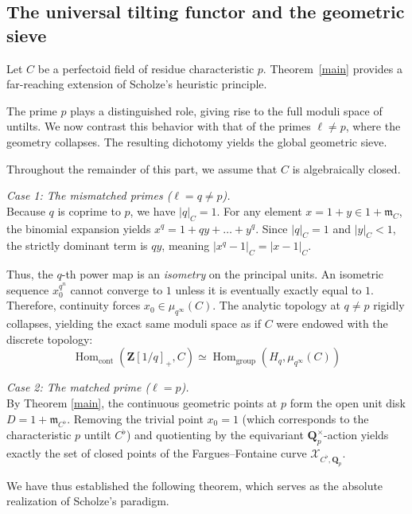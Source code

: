 \documentclass[11pt,a4paper]{article}
\newcommand{\Q}{\mathbf{Q}}
\newcommand{\Z}{\mathbf{Z}}
\begin{document}
\subsection{The universal tilting functor and the geometric sieve}


Let $C$ be a perfectoid field of residue characteristic $p$.
Theorem~\ref{main} provides a far-reaching extension of Scholze's heuristic principle.

The prime $p$ plays a distinguished role, giving rise to the full moduli space of untilts. We now contrast this behavior with that of the primes $\ell\neq p$, where the geometry collapses. The resulting dichotomy yields the global geometric sieve. \vspace{.03in}

Throughout the remainder of this part, we assume that $C$ is algebraically closed.\vspace{.05in}

\emph{Case 1: The mismatched primes ($\ell = q \neq p$).} \\
Because $q$ is coprime to $p$, we have $|q|_C = 1$. For any element $x = 1+y \in 1 + \mathfrak{m}_C$, the binomial expansion yields $x^q = 1 + qy + \dots + y^q$. Since $|q|_C=1$ and $|y|_C<1$, the strictly dominant term is $qy$, meaning $|x^q - 1|_C = |x - 1|_C$. 

Thus, the $q$-th power map is an \emph{isometry} on the principal units. An isometric sequence $x_0^{q^n}$ cannot converge to $1$ unless it is eventually exactly equal to $1$. Therefore, continuity forces $x_0 \in \mu_{q^\infty}(C)$. The analytic topology at $q \neq p$ rigidly collapses, yielding the exact same moduli space as if $C$ were endowed with the discrete topology:
\[
\operatorname{Hom}_{\text{cont}}(\Z[1/q]_+, C) \simeq \operatorname{Hom}_{\text{group}}(H_q, \mu_{q^\infty}(C))
\]

\emph{Case 2: The matched prime ($\ell = p$).} \\
By Theorem \ref{main}, the continuous geometric points at $p$ form the open unit disk $D = 1 + \mathfrak{m}_{C^\flat}$. Removing the trivial point $x_0=1$ (which corresponds to the characteristic $p$ untilt $C^\flat$) and quotienting by the equivariant $\Q_p^\times$-action yields exactly the set of closed points of the Fargues--Fontaine curve $\mathcal{X}_{C^\flat, \Q_p}$.\vspace{.03in}

We have thus established the following   theorem, which serves as the absolute realization of Scholze's paradigm.
\end{document}
